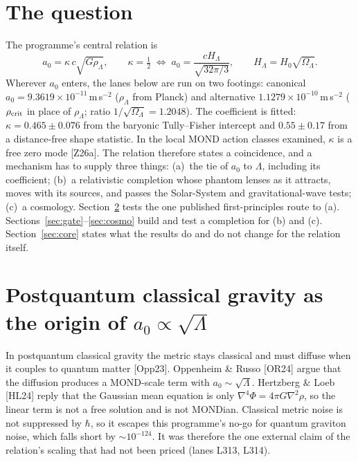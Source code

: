 \documentclass[10pt]{article}
\begin{document}
\section{The question}

The programme's central relation is
\begin{equation}
a_0=\kappa\,c\sqrt{G\rho_\Lambda},\qquad \kappa=\tfrac12\;\Longleftrightarrow\; a_0=\frac{cH_\Lambda}{\sqrt{32\pi/3}},\qquad H_\Lambda=H_0\sqrt{\Omega_\Lambda}.
\end{equation}
Wherever $a_0$ enters, the lanes below are run on two footings: canonical $a_0=9.3619\times10^{-11}$\,m\,s$^{-2}$ ($\rho_\Lambda$ from Planck) and alternative $1.1279\times10^{-10}$\,m\,s$^{-2}$ ($\rho_{\rm crit}$ in place of $\rho_\Lambda$; ratio $1/\sqrt{\Omega_\Lambda}=1.2048$).
The coefficient is fitted: $\kappa=0.465\pm0.076$ from the baryonic Tully--Fisher intercept and $0.55\pm0.17$ from a distance-free shape statistic. In the local MOND action classes examined, $\kappa$ is a free zero mode [Z26a]. The relation therefore states a coincidence, and a mechanism has to supply three things:
(a)~the tie of $a_0$ to $\Lambda$, including its coefficient;
(b)~a relativistic completion whose phantom lenses as it attracts, moves with its sources, and passes the Solar-System and gravitational-wave tests;
(c)~a cosmology.
Section~\ref{sec:cq} tests the one published first-principles route to (a). Sections~\ref{sec:gate}--\ref{sec:cosmo} build and test a completion for (b) and (c). Section~\ref{sec:core} states what the results do and do not change for the relation itself.

\section{Postquantum classical gravity as the origin of $a_0\propto\sqrt\Lambda$}\label{sec:cq}

In postquantum classical gravity the metric stays classical and must diffuse when it couples to quantum matter [Opp23]. Oppenheim \& Russo [OR24] argue that the diffusion produces a MOND-scale term with $a_0\sim\sqrt\Lambda$. Hertzberg \& Loeb [HL24] reply that the Gaussian mean equation is only $\nabla^4\Phi=4\pi G\nabla^2\rho$, so the linear term is not a free solution and is not MONDian. Classical metric noise is not suppressed by $\hbar$, so it escapes this programme's no-go for quantum graviton noise, which falls short by $\sim\!10^{-124}$. It was therefore the one external claim of the relation's scaling that had not been priced (lanes L313, L314).
\end{document}
